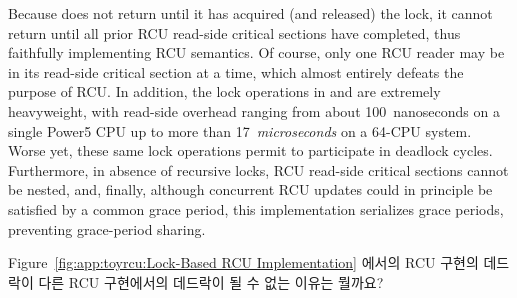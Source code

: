 Because  does not return until it has acquired
(and released) the lock, it cannot return until all prior RCU read-side
critical sections have completed, thus faithfully implementing
RCU semantics.
Of course, only one RCU reader may be in its read-side critical section
at a time, which almost entirely defeats the purpose of RCU.
In addition, the lock operations in  and
 are extremely heavyweight,
with read-side overhead ranging from about 100~nanoseconds on a single Power5
CPU up to more than 17~\emph{microseconds} on a 64-CPU system.
Worse yet,
these same lock operations permit 
to participate in deadlock cycles.
Furthermore, in absence of recursive locks,
RCU read-side critical sections cannot be nested, and, finally,
although concurrent RCU updates could in principle be satisfied by
a common grace period, this implementation serializes grace periods,
preventing grace-period sharing.
\fi

\QuickQuiz{}
	Figure~\ref{fig:app:toyrcu:Lock-Based RCU Implementation} 에서의 RCU 구현의
	데드락이 다른 RCU 구현에서의 데드락이 될 수 없는 이유는 뭘까요?
	\iffalse

